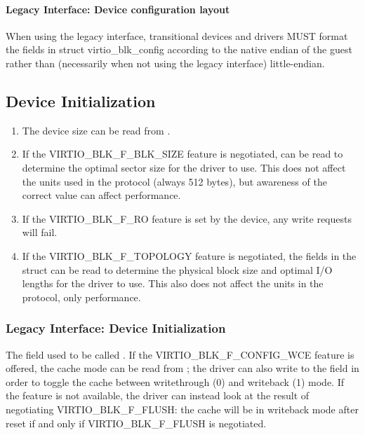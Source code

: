 \paragraph{Legacy Interface: Device configuration layout}\label{sec:Device Types / Block Device / Feature bits / Device configuration layout / Legacy Interface: Device configuration layout}
When using the legacy interface, transitional devices and drivers
MUST format the fields in struct virtio_blk_config
according to the native endian of the guest rather than
(necessarily when not using the legacy interface) little-endian.


\subsection{Device Initialization}\label{sec:Device Types / Block Device / Device Initialization}

\begin{enumerate}
\item The device size can be read from .

\item If the VIRTIO_BLK_F_BLK_SIZE feature is negotiated,
   can be read to determine the optimal sector size
  for the driver to use. This does not affect the units used in
  the protocol (always 512 bytes), but awareness of the correct
  value can affect performance.

\item If the VIRTIO_BLK_F_RO feature is set by the device, any write
  requests will fail.

\item If the VIRTIO_BLK_F_TOPOLOGY feature is negotiated, the fields in the
   struct can be read to determine the physical block size and optimal
  I/O lengths for the driver to use. This also does not affect the units
  in the protocol, only performance.
\end{enumerate}

\subsubsection{Legacy Interface: Device Initialization}\label{sec:Device Types / Block Device / Device Initialization / Legacy Interface: Device Initialization}

The  field used to be called .  If the
VIRTIO_BLK_F_CONFIG_WCE feature is offered, the cache mode can be
read from ; the
driver can also write to the field in order to toggle the cache
between writethrough (0) and writeback (1) mode.  If the feature is
not available, the driver can instead look at the result of
negotiating VIRTIO_BLK_F_FLUSH: the cache will be in writeback mode
after reset if and only if VIRTIO_BLK_F_FLUSH is negotiated.


